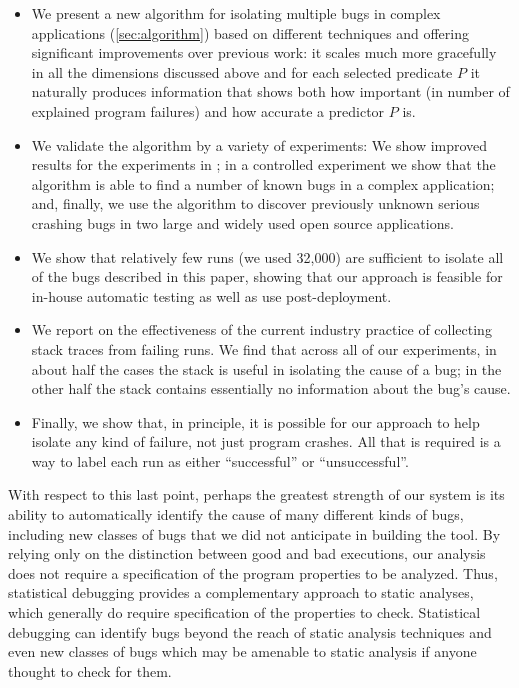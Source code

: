 \documentclass[draft]{sig-alternate}
\newcommand{\issue}[2][]{}
\begin{document}
\begin{itemize}

\item We present a new algorithm for isolating multiple bugs in
complex applications (\autoref{sec:algorithm}) based on different
techniques and offering significant improvements over previous work:
it scales much more gracefully in all the dimensions discussed above
and for each selected predicate $P$ it naturally produces information
that shows both how important (in number of explained program
failures) and how accurate a predictor $P$ is.
\issue[Mayur]{Change "We present a new algorithm ... based on
  different techniques and offering significant improvements over
  previous work" to "We present a new algorithm ... based on
  techniques that are different from and offer significant
  improvements over previous work"?}

\item We validate the algorithm by a variety of experiments: We show
improved results for the experiments in \cite{PLDI`03*141}; in a
controlled experiment we show that the algorithm is able to find a
number of known bugs in a complex application; and, finally, we use
the algorithm to discover previously unknown serious crashing bugs in
two large and widely used open source applications.

\item We show that relatively few runs (we used 32,000) are sufficient
to isolate all of the bugs described in this paper, showing that our
approach is feasible for in-house automatic testing as well as use
post-deployment.

\item We report on the effectiveness of the current industry practice
of collecting stack traces from failing runs.  We find that across all
of our experiments, in about half the cases the stack is useful in
isolating the cause of a bug; in the other half the stack contains
essentially no information about the bug's cause.

\item Finally, we show that, in principle, it is possible for our
approach to help isolate any kind of failure, not just program
crashes.  All that is required is a way to label each run as either
``successful'' or ``unsuccessful''.

\end{itemize}

With respect to this last point, perhaps the greatest strength of our
system is its ability to automatically identify the cause of many
different kinds of bugs, including new classes of bugs that we did not
anticipate in building the tool.  By relying only on the distinction
between good and bad executions, our analysis does not require a
specification of the program properties to be analyzed.  Thus,
statistical debugging provides a complementary approach to static
analyses, which generally do require specification of the properties
to check.  Statistical debugging can identify bugs beyond the reach of
static analysis techniques and even new classes of bugs which may be
amenable to static analysis if anyone thought to check for them.
\end{document}
